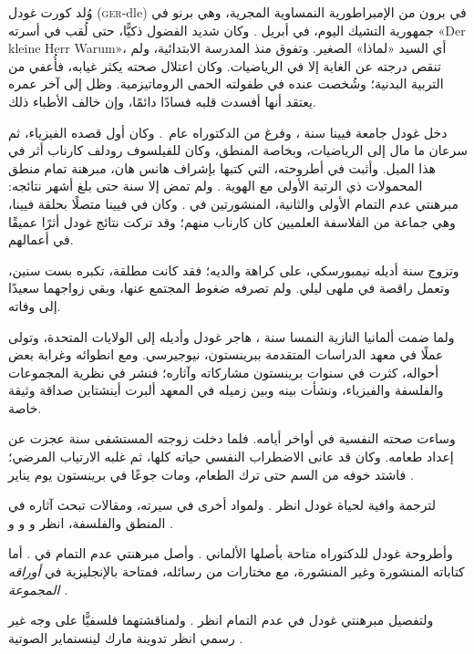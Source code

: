 \documentclass[../../../include/open-logic-section]{subfiles}
\begin{document}



وُلد كورت غودل (\textsc{ger}-dle) في برون من الإمبراطورية
النمساوية المجرية، وهي برنو في جمهورية التشيك اليوم، في  أبريل .
وكان شديد الفضول ذكيًّا، حتى لُقب في أسرته «Der kleine Herr Warum»،
أي السيد «لماذا» الصغير. وتفوق منذ المدرسة الابتدائية، ولم تنقص درجته
عن الغاية إلا في الرياضيات. وكان اعتلال صحته يكثر غيابه، فأُعفي من
التربية البدنية؛ وشُخصت عنده في طفولته الحمى الروماتيزمية. وظل إلى آخر
عمره يعتقد أنها أفسدت قلبه فسادًا دائمًا، وإن خالف الأطباء ذلك.

دخل غودل جامعة فيينا سنة ، وفرغ من الدكتوراه عام~. وكان أول
قصده الفيزياء، ثم سرعان ما مال إلى الرياضيات، وبخاصة المنطق، وكان
للفيلسوف رودلف كارناب أثر في هذا الميل. وأثبت في أطروحته، التي كتبها
بإشراف هانس هان، مبرهنة تمام منطق المحمولات ذي الرتبة الأولى مع الهوية
\citep{Godel1929}. ولم تمض إلا سنة حتى بلغ أشهر نتائجه: مبرهنتي عدم
التمام الأولى والثانية، المنشورتين في \citealt{Godel1931}. وكان في
فيينا متصلًا بحلقة فيينا، وهي جماعة من الفلاسفة العلميين كان كارناب
منهم؛ وقد تركت نتائج غودل أثرًا عميقًا في أعمالهم.

وتزوج سنة  أديله نيمبورسكي، على كراهة والديه؛ فقد كانت مطلقة، تكبره
بست سنين، وتعمل راقصة في ملهى ليلي. ولم تصرفه ضغوط المجتمع عنها، وبقي
زواجهما سعيدًا إلى وفاته.

ولما ضمت ألمانيا النازية النمسا سنة ، هاجر غودل وأديله إلى الولايات
المتحدة، وتولى عملًا في معهد الدراسات المتقدمة ببرينستون، نيوجيرسي.
ومع انطوائه وغرابة بعض أحواله، كثرت في سنوات برينستون مشاركاته وآثاره؛
فنشر في نظرية المجموعات والفلسفة والفيزياء، ونشأت بينه وبين زميله في
المعهد ألبرت أينشتاين صداقة وثيقة خاصة.

وساءت صحته النفسية في أواخر أيامه. فلما دخلت زوجته المستشفى سنة 
عجزت عن إعداد طعامه. وكان قد عانى الاضطراب النفسي حياته كلها، ثم غلبه
الارتياب المرضي؛ فاشتد خوفه من السم حتى ترك الطعام، ومات جوعًا في
برينستون يوم  يناير .

\begin{reading}
لترجمة وافية لحياة غودل انظر \citet{Dawson1997}. ولمواد أخرى في سيرته،
ومقالات تبحث آثاره في المنطق والفلسفة،
انظر \citet{Wang1990} و\citet{Baaz2011} و\citet{Takeuti2003} و
\citet{Sigmund2007}.

وأطروحة غودل للدكتوراه متاحة بأصلها الألماني \citep{Godel1929}.
وأصل مبرهنتي عدم التمام في \citep{Godel1931}. أما كتاباته المنشورة وغير
المنشورة، مع مختارات من رسائله، فمتاحة بالإنجليزية في
\emph{أوراقه المجموعة} \citet{Godel1986,Godel1990}.

ولتفصيل مبرهنتي غودل في عدم التمام انظر \citet{Smith2013}. ولمناقشتهما
فلسفيًّا على وجه غير رسمي انظر تدوينة مارك لينسنماير الصوتية
\citep{Linsenmayer2014}.
\end{reading}
\end{document}
